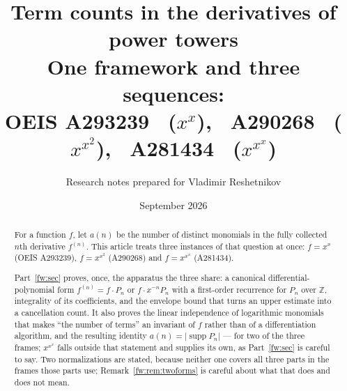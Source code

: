 \documentclass[11pt,a4paper]{article}
\title{\textbf{Term counts in the derivatives of power towers}\\[5pt]
\large One framework and three sequences:\\
OEIS A293239 \ ($x^x$), \ A290268 \ ($x^{x^2}$), \ A281434 \ ($x^{x^x}$)}
\author{Research notes prepared for Vladimir Reshetnikov}
\date{September 2026}
\numberwithin{equation}{section}
\theoremstyle{definition}
\theoremstyle{remark}
\theoremstyle{plain}
\DeclareMathOperator{\supp}{supp}
\newcommand{\Z}{\mathbb Z}
\begin{document}
\maketitle

\begin{abstract}
For a function $f$, let $a(n)$ be the number of distinct monomials in the fully
collected $n$th derivative $f^{(n)}$.  This article treats three instances of
that question at once: $f=x^x$ (OEIS A293239), $f=x^{x^2}$ (A290268) and
$f=x^{x^x}$ (A281434).

Part~\ref{fw:sec} proves, once, the apparatus the three share: a canonical
differential-polynomial form $f^{(n)}=f\cdot P_n$ or $f\cdot x^{-n}P_n$ with a
first-order recurrence for $P_n$ over $\Z$, integrality of its coefficients, and
the envelope bound that turns an upper estimate into a cancellation count.  It
also proves the linear independence of logarithmic monomials that makes ``the
number of terms'' an invariant of $f$ rather than of a differentiation
algorithm, and the resulting identity $a(n)=|\supp P_n|$ --- for two of the
three frames; $x^{x^x}$ falls outside that statement and supplies its own, as
Part~\ref{fw:sec} is careful to say.  Two normalizations are stated, because neither one covers
all three parts in the frames those parts use; Remark~\ref{fw:rem:twoforms} is
careful about what that does and does not mean.


\end{abstract}
\end{document}
